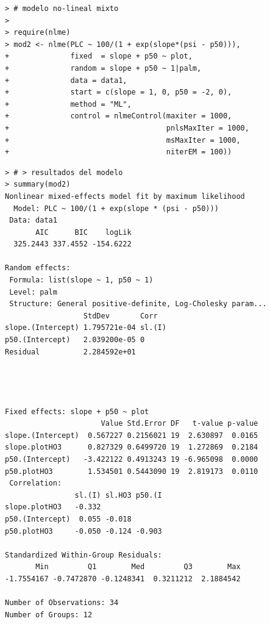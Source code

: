 \documentclass[usepdftitle=false]{beamer}
\begin{document}
\begin{frame}[fragile]
\footnotesize
\begin{lstlisting}
> # modelo no-lineal mixto
>
> require(nlme)
> mod2 <- nlme(PLC ~ 100/(1 + exp(slope*(psi - p50))),
+              fixed  = slope + p50 ~ plot,
+              random = slope + p50 ~ 1|palm,
+              data = data1,
+              start = c(slope = 1, 0, p50 = -2, 0), 
+              method = "ML",
+              control = nlmeControl(maxiter = 1000, 
+                                    pnlsMaxIter = 1000, 
+                                    msMaxIter = 1000,
+                                    niterEM = 100))
\end{lstlisting}
\end{frame}	

\begin{frame}
\footnotesize
\begin{lstlisting}
> # > resultados del modelo             
> summary(mod2)
Nonlinear mixed-effects model fit by maximum likelihood
  Model: PLC ~ 100/(1 + exp(slope * (psi - p50))) 
 Data: data1 
       AIC      BIC    logLik
  325.2443 337.4552 -154.6222

Random effects:
 Formula: list(slope ~ 1, p50 ~ 1)
 Level: palm
 Structure: General positive-definite, Log-Cholesky param...
                  StdDev       Corr  
slope.(Intercept) 1.795721e-04 sl.(I)
p50.(Intercept)   2.039200e-05 0     
Residual          2.284592e+01       




Fixed effects: slope + p50 ~ plot 
                      Value Std.Error DF   t-value p-value
slope.(Intercept)  0.567227 0.2156021 19  2.630897  0.0165
slope.plotHO3      0.827329 0.6499720 19  1.272869  0.2184
p50.(Intercept)   -3.422122 0.4913243 19 -6.965098  0.0000
p50.plotHO3        1.534501 0.5443090 19  2.819173  0.0110
 Correlation: 
                sl.(I) sl.HO3 p50.(I
slope.plotHO3   -0.332              
p50.(Intercept)  0.055 -0.018       
p50.plotHO3     -0.050 -0.124 -0.903

Standardized Within-Group Residuals:
       Min         Q1        Med         Q3        Max 
-1.7554167 -0.7472870 -0.1248341  0.3211212  2.1884542 

Number of Observations: 34
Number of Groups: 12
\end{lstlisting}
\end{frame}	
\end{document}
